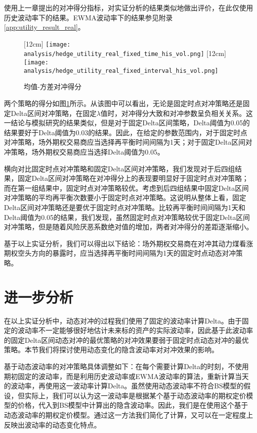 使用上一章提出的对冲得分指标，对实证分析的结果类似地做出评价，在此仅使用历史波动率下的结果。EWMA波动率下的结果参见附录\ref{app:utility_result_real}。

\begin{figure}[htb]
  \centering
  [12cm]
    {\texttt{[image: analysis/hedge\_utility\_real\_fixed\_time\_his\_vol.png]}}
  \hspace{0.5cm}
  [12cm]
    {\texttt{[image: analysis/hedge\_utility\_real\_fixed\_interval\_his\_vol.png]}}
    \caption[这里将出现在插图索引中]
    {均值-方差对冲得分}
  \label{fig:hedge_utility_real}
\end{figure}

两个策略的得分如图\ref{fig:hedge_utility_real}所示。从该图中可以看出，无论是固定时点对冲策略还是固定Delta区间对冲策略，在固定$\lambda$值时，对冲得分大致和对冲参数呈负相关关系。这一结论与模拟研究的结果类似，但是对于固定Delta区间策略，Delta阈值为0.05的结果要好于Delta阈值为0.03的结果。因此，在给定的参数范围内，对于固定时点对冲策略，场外期权交易商应当选择再平衡时间间隔为1天；对于固定Delta区间对冲策略，场外期权交易商应当选择Delta阈值为0.05。

横向对比固定时点对冲策略和固定Delta区间对冲策略，我们发现对于后四组结果，固定Delta区间对冲策略在对冲得分上的表现要明显好于固定时点对冲策略；而在第一组结果中，固定时点对冲策略较优。考虑到后四组结果中固定Delta区间对冲策略的平均再平衡次数要小于固定时点对冲策略。这说明从整体上看，固定Delta区间对冲策略还是要优于固定时点对冲策略。比较再平衡时间间隔为1天和Delta阈值为0.05的结果，我们发现，虽然固定时点对冲策略较优于固定Delta区间对冲策略，但是随着风险厌恶系数绝对值的增加，两者对冲得分的差距逐渐缩小。

基于以上实证分析，我们可以得出以下结论：场外期权交易商在对冲其动力煤看涨期权空头方向的暴露时，应当选择再平衡时间间隔为1天的固定时点动态对冲策略。

\section{进一步分析}

在以上实证分析中，动态对冲的过程我们使用了固定的波动率计算Delta。由于固定的波动率不一定能够很好地估计未来标的资产的实际波动率，因此基于此波动率的固定Delta区间动态对冲的最优策略的对冲效果要弱于固定时点动态对冲的最优策略。本节我们将探讨使用动态变化的隐含波动率对对冲效果的影响。

基于动态波动率的对冲策略具体调整如下：在每个需要计算Delta的时刻，不使用期初固定的波动率，而是利用历史波动率或EWMA波动率的算法，重新计算当天的波动率，再使用这一波动率计算Delta。虽然使用动态波动率不符合BS模型的假设，但实际上，我们可以认为这一波动率是根据某个基于动态波动率的期权定价模型的价格，代入到BS模型中计算出的隐含波动率。因此，我们是在使用这个基于动态波动率的期权定价模型。通过这一方法我们简化了计算，又可以在一定程度上反映出波动率的动态变化特点。

